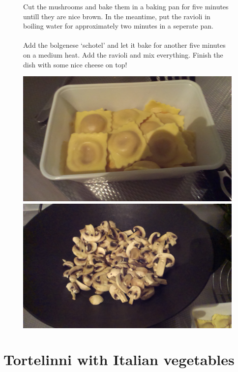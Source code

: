 \documentclass[a4paper,12pt]{report}
\begin{document}
\begin{figure}[h]

\begin{minipage}{0.6\textwidth}
Cut the mushrooms and bake them in a baking pan for five minutes untill they are nice brown. In the meantime, put the ravioli in boiling water for approximately two minutes in a seperate pan.  \\
\\
Add the bolgenese `schotel' and let it bake for another five minutes on a medium heat. Add the ravioli and mix everything. Finish the dish with some nice cheese on top!

\end{minipage}
\begin{minipage}{0.35\textwidth}
	\includegraphics[scale=0.065]{Images/ravioli.jpg}
	\includegraphics[scale=0.065]{Images/mushroom.jpg}
\end{minipage}
\end{figure}


\chapter{Tortelinni with Italian vegetables}
\end{document}
